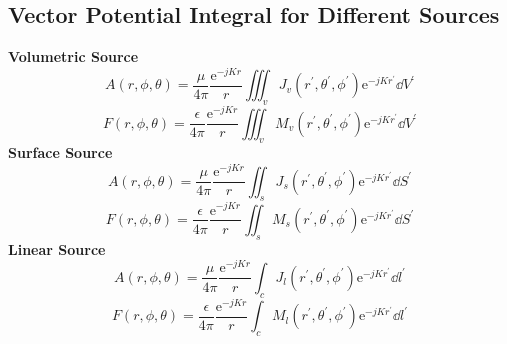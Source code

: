 \documentclass[class=article, crop=false]{standalone}
\begin{document}
    \subsection{Vector Potential Integral for Different Sources}
    \textbf{
        Volumetric Source
    }
    \begin{equation}
        A(r, \phi, \theta) = \frac{\mu}{4 \pi} \frac{\mathrm{e}^{-jKr}}{r} \iiint_v J_v(r^\prime, \theta^\prime, \phi^\prime)
        \mathrm{e}^{-jKr^\prime} \dd V^\prime
    \end{equation}
    \begin{equation}
        F(r, \phi, \theta) = \frac{\epsilon}{4 \pi} \frac{\mathrm{e}^{-jKr}}{r} \iiint_v
        M_v(r^\prime, \theta^\prime, \phi^\prime) \mathrm{e}^{-jKr^\prime} \dd V^\prime
    \end{equation}
    \textbf{
        Surface Source
    }
    \begin{equation}
        A(r, \phi, \theta) = \frac{\mu}{4 \pi} \frac{\mathrm{e}^{-jKr}}{r} \iint_s J_s(r^\prime, \theta^\prime, \phi^\prime)
        \mathrm{e}^{-jKr^\prime} \dd S^\prime
    \end{equation}
    \begin{equation}
        F(r, \phi, \theta) = \frac{\epsilon}{4 \pi} \frac{\mathrm{e}^{-jKr}}{r} \iint_s
        M_s(r^\prime, \theta^\prime, \phi^\prime) \mathrm{e}^{-jKr^\prime} \dd S^\prime
    \end{equation}
    \textbf{
        Linear Source
    }
    \begin{equation}
        A(r, \phi, \theta) = \frac{\mu}{4 \pi} \frac{\mathrm{e}^{-jKr}}{r} \int_c J_l(r^\prime, \theta^\prime, \phi^\prime)
        \mathrm{e}^{-jKr^\prime} \dd l^\prime
    \end{equation}
    \begin{equation}
        F(r, \phi, \theta) = \frac{\epsilon}{4 \pi} \frac{\mathrm{e}^{-jKr}}{r} \int_c
        M_l(r^\prime, \theta^\prime, \phi^\prime) \mathrm{e}^{-jKr^\prime} \dd l^\prime
    \end{equation}
\end{document}
